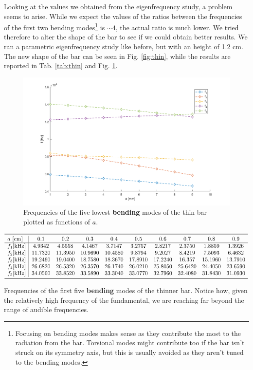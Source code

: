 \documentclass[a4paper]{article}
\begin{document}
Looking at the values we obtained from the eigenfrequency study, a problem seems to arise. While we expect the values of the ratios between the frequencies of the first two bending modes\footnote{Focusing on bending modes makes sense as they contribute the most to the radiation from the bar. Torsional modes might contribute too if the bar isn't struck on its symmetry axis, but this is usually avoided as they aren't tuned to the bending modes.} is $\sim 4$, the actual ratio is much lower. We tried therefore to alter the shape of the bar to see if we could obtain better results. We ran a parametric eigenfrequency study like before, but with an height of 1.2 cm. The new shape of the bar can be seen in Fig. \ref{fig:thin}, while the results are reported in Tab. \ref{tab:thin} and Fig. \ref{fig:threqz}.

\begin{figure}[h]
	\centering
	\includegraphics[width=0.85\linewidth]{freqz.png}
	\caption{Frequencies of the five lowest \textbf{bending} modes of the thin bar plotted as functions of $a$.}
	\label{fig:threqz}
\end{figure}

\begin{table}[h]
	\centering
	$\begin{array}{l|ccccccccc}
		\toprule
		a~[\si{\centi\meter}] & 0.1 & 0.2 & 0.3 & 0.4 & 0.5 & 0.6 & 0.7 & 0.8 & 0.9\\
		\hline
		f_1[\si{\kilo\hertz}]&4.9342   & 4.5558  &  4.1467  &  3.7147   & 3.2757  &  2.8217 &   2.3750 &   1.8859 &   1.3926\\
		f_2[\si{\kilo\hertz}]&11.7320  & 11.3950  & 10.9690 &  10.4580 &   9.8794  &  9.2027  &  8.4219  &  7.5093  &  6.4632\\
		f_3[\si{\kilo\hertz}]&19.2460  & 19.0400  & 18.7580 &  18.3670 &  17.8910  & 17.2240 &   16.357 &  15.1960 &  13.7910\\
		f_4[\si{\kilo\hertz}]&26.6820  & 26.5320  & 26.3570 &  26.1740  & 26.0210 &  25.8050 &  25.6420  & 24.4050 &  23.6590\\
		f_5[\si{\kilo\hertz}]&34.0560 &  33.8520  & 33.5890  & 33.3040  & 33.0770  & 32.7960  & 32.4080 &  31.8430  & 31.0930\\
		\bottomrule
	\end{array}$
	\caption{Frequencies of the first five \textbf{bending} modes of the thinner bar. Notice how, given the relatively high frequency of the fundamental, we are reaching far beyond the range of audible frequencies.}
	\label{tab:thin}
\end{table}
\end{document}
